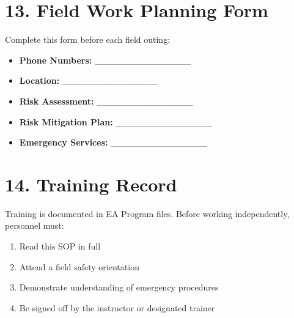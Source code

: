 \documentclass[
  11pt,
  letterpaper,
]{article}
\providecommand{\tightlist}{%
  \setlength{\itemsep}{0pt}\setlength{\parskip}{0pt}}
\begin{document}
\section{13. Field Work Planning Form}\label{field-work-planning-form}

Complete this form before each field outing:

\begin{itemize}
\tightlist
\item
  \textbf{Phone Numbers:} \_\_\_\_\_\_\_\_\_\_\_\_\_\_\_
\item
  \textbf{Location:} \_\_\_\_\_\_\_\_\_\_\_\_\_\_\_
\item
  \textbf{Risk Assessment:} \_\_\_\_\_\_\_\_\_\_\_\_\_\_\_
\item
  \textbf{Risk Mitigation Plan:} \_\_\_\_\_\_\_\_\_\_\_\_\_\_\_
\item
  \textbf{Emergency Services:} \_\_\_\_\_\_\_\_\_\_\_\_\_\_\_
\end{itemize}

\section{14. Training Record}\label{training-record}

Training is documented in EA Program files. Before working
independently, personnel must:

\begin{enumerate}
\def\labelenumi{\arabic{enumi}.}
\tightlist
\item
  Read this SOP in full
\item
  Attend a field safety orientation
\item
  Demonstrate understanding of emergency procedures
\item
  Be signed off by the instructor or designated trainer
\end{enumerate}
\end{document}
